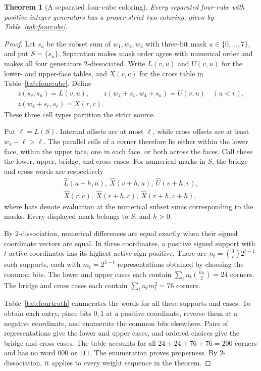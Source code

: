 \documentclass[11pt,a4paper]{article}
\newtheorem{theorem}{Theorem}[section]
\theoremstyle{definition}
\numberwithin{equation}{section}
\begin{document}
\begin{theorem}[A separated four-cube coloring]\label{thm:fourcube}
Every separated four-cube with positive integer generators has a proper
strict two-coloring, given by Table~\ref{tab:fourcube}.
\end{theorem}
\begin{proof}
Let $s_u$ be the subset sum of $w_1,w_2,w_3$ with three-bit mask
$u\in\{0,\ldots,7\}$, and put $S=\{s_u\}$.
Separation makes mask order agree with numerical order and makes
all four generators $2$-dissociated.
Write $L(v,u)$ and $U(v,u)$ for the lower- and upper-face tables,
and $X(r,c)$ for the cross table in Table~\ref{tab:fourcube}.
Define
\begin{equation}\label{eq:fourcube-coloring}
\begin{gathered}
z(s_v,s_u)=L(v,u),\qquad
z(w_4+s_v,w_4+s_u)=U(v,u)\quad(u<v),\\
z(w_4+s_r,s_c)=X(r,c).
\end{gathered}
\end{equation}
These three cell types partition the strict source.

Put $\ell=L(S)$. Internal offsets are at most $\ell$, while cross
offsets are at least $w_4-\ell>\ell$.
The parallel cells of a corner therefore lie either within the
lower face, within the upper face, one in each face, or both across
the faces. Call these the lower, upper, bridge, and cross cases.
For numerical marks in $S$, the bridge and cross words are respectively
\[
\begin{gathered}
\widehat L(u+h,u),\ \widehat X(v+h,u),\ \widehat U(v+h,v),\\
\widehat X(r,c),\ \widehat X(r+h,c),\ \widehat X(r+h,c+h),
\end{gathered}
\]
where hats denote evaluation at the numerical subset sums corresponding to the masks.
Every displayed mark belongs to $S$, and $h>0$.

By $2$-dissociation, numerical differences are equal exactly when
their signed coordinate vectors are equal. In three coordinates,
a positive signed support with $t$ active coordinates has its highest
active sign positive. There are $n_t=\binom3t2^{t-1}$ such supports,
each with $m_t=2^{3-t}$ representations obtained by choosing the
common bits. The lower and upper cases each contain
$\sum_t n_t\binom{m_t}{2}=24$ corners.
The bridge and cross cases each contain
$\sum_tn_tm_t^2=76$ corners.

Table~\ref{tab:fourtruth} enumerates the words for all these supports
and cases. To obtain each entry, place bits $0,1$ at a positive
coordinate, reverse them at a negative coordinate, and enumerate
the common bits elsewhere. Pairs of representations give the lower and
upper cases, and ordered choices give the bridge and cross cases.
The table accounts for all $24+24+76+76=200$ corners and has no word
$000$ or $111$. The enumeration proves properness. By
$2$-dissociation, it applies to every weight sequence in the theorem.
\end{proof}
\end{document}
